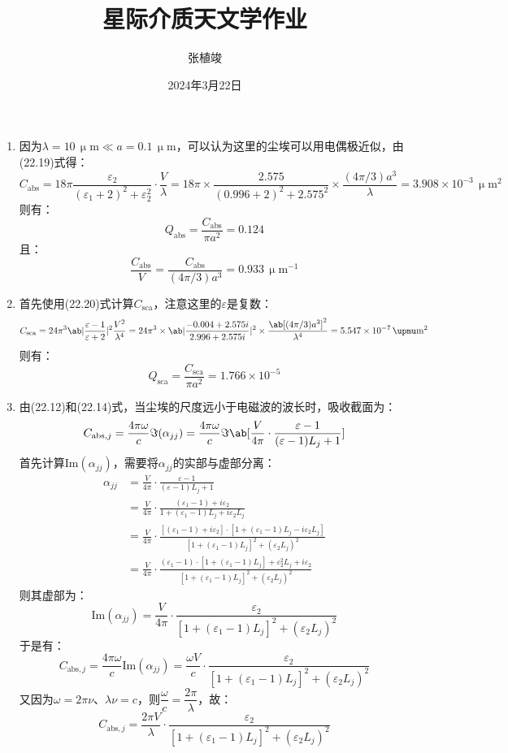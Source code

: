 \documentclass[a4paper,fontset=none]{ctexart}
\title{\textbf{星际介质天文学作业}}
\author{张植竣}
\date{2024年3月22日}
\newcommand{\um}{\upmu\mathrm{m}}
\renewcommand\epsilon{\varepsilon}
\begin{document}
\maketitle

\begin{enumerate}
    \item[22.1 (a)]
    因为$\lambda = 10\,\um \ll a = 0.1\,\um$，可以认为这里的尘埃可以用电偶极近似，由(22.19)式得：
    \[
        C_{\mathrm{abs}}
        = 18\pi \frac{\epsilon_2}{(\epsilon_1 + 2)^2 + \epsilon_2^2} \cdot \frac{V}{\lambda}
        = 18\pi \times \frac{2.575}{(0.996 + 2)^2 + 2.575^2} \times \frac{(4\pi/3)a^3}{\lambda} = 3.908 \times 10^{-3}\,\um^2
    \]
    则有：
    \[
        Q_{\mathrm{abs}} = \frac{C_{\mathrm{abs}}}{\pi a^2} = 0.124
    \]
    且：
    \[
        \frac{C_{\mathrm{abs}}}{V} = \frac{C_{\mathrm{abs}}}{(4\pi/3)a^3} = 0.933\,\um^{-1}
    \]

    \medskip
    \item[22.1 (b)]
    首先使用(22.20)式计算$C_{\mathrm{sca}}$，注意这里的$\epsilon$是复数：
    \[
        C_{\mathrm{sca}}
        = 24\pi^3 \ab|\frac{\epsilon - 1}{\epsilon + 2}|^2 \frac{V^2}{\lambda^4}
        = 24\pi^3 \times \ab|\frac{-0.004 + 2.575i}{2.996 + 2.575i}|^2 \times \frac{\ab[(4\pi/3)a^3]^2}{\lambda^4} = 5.547 \times 10^{-7}\,\um^2
    \]
    则有：
    \[
        Q_{\mathrm{sca}} = \frac{C_{\mathrm{sca}}}{\pi a^2} = 1.766 \times 10^{-5}
    \]

    \bigskip
    \item[22.2 (a)]
    由(22.12)和(22.14)式，当尘埃的尺度远小于电磁波的波长时，吸收截面为：
    \[
        C_{\mathrm{abs},j} = \frac{4\pi\omega}{c}\Im(\alpha_{jj}) = \frac{4\pi\omega}{c}\Im\ab[\frac{V}{4\pi} \cdot \frac{\epsilon - 1}{(\epsilon - 1)L_j + 1}]
    \]
    首先计算$\mathrm{Im}(\alpha_{jj})$，需要将$\alpha_{jj}$的实部与虚部分离：
    \begin{align*}
        \alpha_{jj}
        &= \frac{V}{4\pi} \cdot \frac{\epsilon - 1}{(\epsilon - 1)L_j + 1} \\
        &= \frac{V}{4\pi} \cdot \frac{(\epsilon_1 - 1) + i\epsilon_2}{1 + (\epsilon_1 - 1)L_j + i\epsilon_2 L_j} \\
        &= \frac{V}{4\pi} \cdot \frac{[(\epsilon_1 - 1) + i\epsilon_2] \cdot [1 + (\epsilon_1 - 1)L_j - i\epsilon_2 L_j]}{[1 + (\epsilon_1 - 1)L_j]^2 + (\epsilon_2 L_j)^2} \\
        &= \frac{V}{4\pi} \cdot \frac{(\epsilon_1 - 1) \cdot [1 + (\epsilon_1 - 1)L_j] + \epsilon_2^2 L_j + i\epsilon_2}{[1 + (\epsilon_1 - 1)L_j]^2 + (\epsilon_2 L_j)^2}
    \end{align*}
    则其虚部为：
    \[
        \mathrm{Im}(\alpha_{jj}) = \frac{V}{4\pi} \cdot \frac{\epsilon_2}{[1 + (\epsilon_1 - 1)L_j]^2 + (\epsilon_2 L_j)^2}
    \]
    于是有：
    \[
        C_{\mathrm{abs},j} = \frac{4\pi\omega}{c}\mathrm{Im}(\alpha_{jj}) = \frac{\omega V}{c} \cdot \frac{\epsilon_2}{[1 + (\epsilon_1 - 1)L_j]^2 + (\epsilon_2 L_j)^2}
    \]
    又因为$\omega = 2\pi\nu$、$\lambda\nu = c$，则$\dfrac{\omega}{c} = \dfrac{2\pi}{\lambda}$，故：
    \[
        C_{\mathrm{abs},j} = \frac{2\pi V}{\lambda} \cdot \frac{\epsilon_2}{[1 + (\epsilon_1 - 1)L_j]^2 + (\epsilon_2 L_j)^2}
    \]


\end{enumerate}
\end{document}
